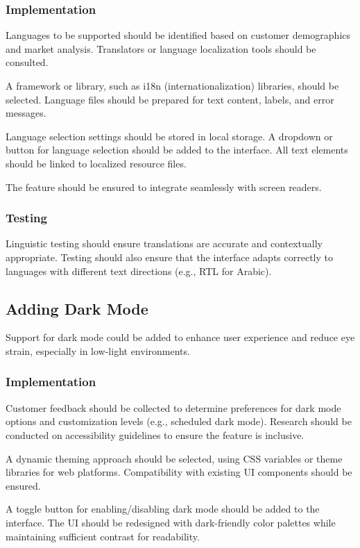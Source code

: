 \documentclass[twoside,a4paper,journal]{IEEEtran}
\begin{document}
\subsubsection{Implementation}
Languages to be supported should be identified based on customer demographics
and market analysis. Translators or language localization tools should be
consulted.

A framework or library, such as i18n (internationalization) libraries, should
be selected. Language files should be prepared for text content,
labels, and error messages.

Language selection settings should be stored in local storage.
A dropdown or button for language selection should be added to the interface.
All text elements should be linked to localized resource files.

The feature should be ensured to
integrate seamlessly with screen readers.

\subsubsection{Testing}
Linguistic testing should ensure translations are accurate and contextually
appropriate.
Testing should also ensure that the interface adapts correctly to languages
with different text directions (e.g., RTL for Arabic).

\subsection{Adding Dark Mode}
Support for dark mode could be added to enhance user experience and reduce eye
strain, especially in low-light environments.

\subsubsection{Implementation}
Customer feedback should be collected to determine preferences for dark mode
options and customization levels (e.g., scheduled dark mode).
Research should be conducted on accessibility guidelines to ensure the feature
is inclusive.

A dynamic theming approach should be selected, using CSS variables or theme
libraries for web platforms.
Compatibility with existing UI components should be ensured.

A toggle button for enabling/disabling dark mode should be added to the
interface.
The UI should be redesigned with dark-friendly color palettes while maintaining
sufficient contrast for readability.
\end{document}
